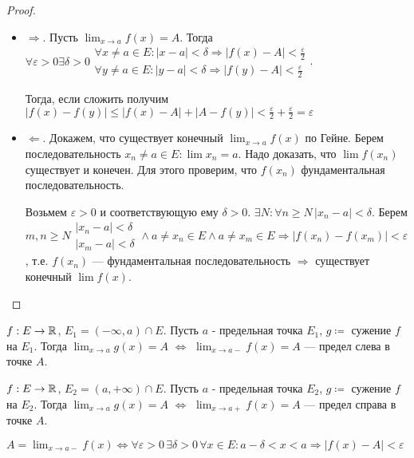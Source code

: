 \begin{proof}
    \slashn
    \begin{itemize}
        \item $\Rightarrow$. Пусть  $\lim_{x\to a} f(x) = A$. Тогда $\forall \varepsilon > 0 \exists \delta > 0 \begin{array}{l} \forall x \neq a \in E: |x-a| < \delta \Rightarrow |f(x) - A| < \frac{\varepsilon}{2} \\ \forall y \neq a \in E: |y-a| < \delta \Rightarrow |f(y) - A| < \frac{\varepsilon}{2} \end{array}$. 

            Тогда, если сложить получим $|f(x) - f(y)| \le |f(x) - A| + |A - f(y)| < \frac{\varepsilon}{2} + \frac{\varepsilon}{2} = \varepsilon$
        \item $\Leftarrow$. Докажем, что существует конечный  $\lim_{x \to a} f(x)$ по Гейне. Берем последовательность $ x_n \neq a \in E: \lim x_n = a$. Надо доказать, что $\lim f(x_n)$ существует и конечен. Для этого проверим, что $f(x_n)$ фундаментальная последовательность.

            Возьмем $\varepsilon > 0$ и соответствующую ему $\delta > 0$.  $\exists N: \forall n \ge N \, |x_n - a| < \delta$. Берем $m, n \ge N \begin{array}{l} |x_n - a| < \delta \\ |x_m- a| < \delta \end{array} \land a \neq x_n \in E \land a \neq x_m \in E \Rightarrow |f(x_n) - f(x_m)| < \varepsilon$, т.е. $f(x_n)$ --- фундаментальная последовательность  $\Rightarrow$ существует конечный  $\lim f(x)$.
    \end{itemize}
\end{proof}
\begin{definition}
    $f: E \to \mathbb{R}$,  $E_1 = (-\infty, a) \cap E$. Пусть  $a$ - предельная точка  $E_1$,  $g \coloneqq$ сужение $f$ на  $E_1$. Тогда $\lim_{x\to a} g(x) = A$ $\iff$ $\lim_{x \to a-} f(x)= A$ --- предел слева в точке $A$.
\end{definition}
\begin{definition}
    $f: E \to \mathbb{R}$,  $E_2 = (a, +\infty) \cap E$. Пусть  $a$ - предельная точка  $E_2$,  $g \coloneqq$ сужение $f$ на  $E_2$. Тогда $\lim_{x\to a} g(x) = A$ $\iff$ $\lim_{x \to a+} f(x)= A$ --- предел справа в точке $A$.
\end{definition}
\begin{remark}
    $A = \lim_{x \to a-} f(x) \iff \forall \varepsilon > 0 \, \exists \delta > 0 \, \forall x \in E: a-\delta < x < a \Rightarrow |f(x) - A| < \varepsilon$
\end{remark}
